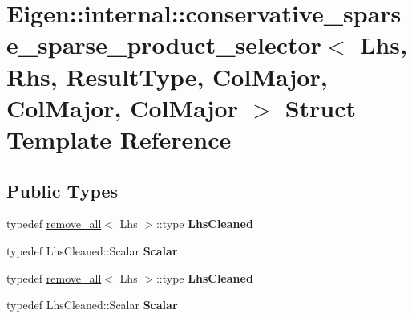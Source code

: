 \hypertarget{struct_eigen_1_1internal_1_1conservative__sparse__sparse__product__selector_3_01_lhs_00_01_rhs_0f4a0316e9e8c40b475b674926b5b8b8d}{}\section{Eigen\+:\+:internal\+:\+:conservative\+\_\+sparse\+\_\+sparse\+\_\+product\+\_\+selector$<$ Lhs, Rhs, Result\+Type, Col\+Major, Col\+Major, Col\+Major $>$ Struct Template Reference}
\label{struct_eigen_1_1internal_1_1conservative__sparse__sparse__product__selector_3_01_lhs_00_01_rhs_0f4a0316e9e8c40b475b674926b5b8b8d}
\subsection*{Public Types}
\begin{DoxyCompactItemize}
\item 
\mbox{\label{struct_eigen_1_1internal_1_1conservative__sparse__sparse__product__selector_3_01_lhs_00_01_rhs_0f4a0316e9e8c40b475b674926b5b8b8d_aa70e3b07c735731b96c8dddbf3f29ade}} 
typedef \hyperlink{struct_eigen_1_1internal_1_1remove__all}{remove\+\_\+all}$<$ Lhs $>$\+::type {\bfseries Lhs\+Cleaned}
\item 
\mbox{\label{struct_eigen_1_1internal_1_1conservative__sparse__sparse__product__selector_3_01_lhs_00_01_rhs_0f4a0316e9e8c40b475b674926b5b8b8d_a42443d6e0197e9e270de6eae45118f69}} 
typedef Lhs\+Cleaned\+::\+Scalar {\bfseries Scalar}
\item 
\mbox{\label{struct_eigen_1_1internal_1_1conservative__sparse__sparse__product__selector_3_01_lhs_00_01_rhs_0f4a0316e9e8c40b475b674926b5b8b8d_aa70e3b07c735731b96c8dddbf3f29ade}} 
typedef \hyperlink{struct_eigen_1_1internal_1_1remove__all}{remove\+\_\+all}$<$ Lhs $>$\+::type {\bfseries Lhs\+Cleaned}
\item 
\mbox{\label{struct_eigen_1_1internal_1_1conservative__sparse__sparse__product__selector_3_01_lhs_00_01_rhs_0f4a0316e9e8c40b475b674926b5b8b8d_a42443d6e0197e9e270de6eae45118f69}} 
typedef Lhs\+Cleaned\+::\+Scalar {\bfseries Scalar}
\end{DoxyCompactItemize}
